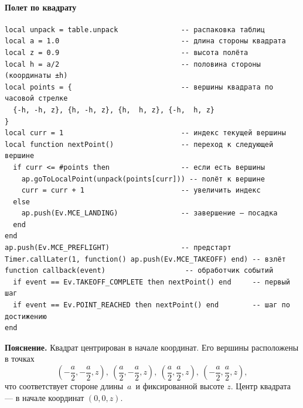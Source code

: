 \paragraph{Полет по квадрату}
\begin{verbatim}
local unpack = table.unpack               -- распаковка таблиц
local a = 1.0                             -- длина стороны квадрата
local z = 0.9                             -- высота полёта
local h = a/2                             -- половина стороны (координаты ±h)
local points = {                          -- вершины квадрата по часовой стрелке
  {-h, -h, z}, {h, -h, z}, {h,  h, z}, {-h,  h, z}
}
local curr = 1                            -- индекс текущей вершины
local function nextPoint()                -- переход к следующей вершине
  if curr <= #points then                 -- если есть вершины
    ap.goToLocalPoint(unpack(points[curr])) -- полёт к вершине
    curr = curr + 1                       -- увеличить индекс
  else
    ap.push(Ev.MCE_LANDING)               -- завершение — посадка
  end
end
ap.push(Ev.MCE_PREFLIGHT)                 -- предстарт
Timer.callLater(1, function() ap.push(Ev.MCE_TAKEOFF) end) -- взлёт
function callback(event)                   -- обработчик событий
  if event == Ev.TAKEOFF_COMPLETE then nextPoint() end     -- первый шаг
  if event == Ev.POINT_REACHED then nextPoint() end        -- шаг по достижению
end
\end{verbatim}
\textbf{Пояснение.} Квадрат центрирован в начале координат. Его вершины расположены в точках
\[
  \left(-\frac{a}{2}, -\frac{a}{2}, z\right),\ \left(\frac{a}{2}, -\frac{a}{2}, z\right),\ \left(\frac{a}{2}, \frac{a}{2}, z\right),\ \left(-\frac{a}{2}, \frac{a}{2}, z\right),
\]
что соответствует стороне длины \(\,a\,\) и фиксированной высоте \(z\). Центр квадрата — в начале координат \((0,0,z)\).

